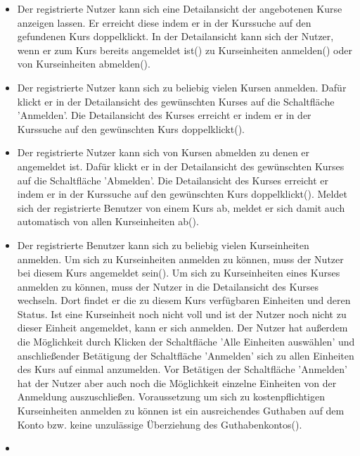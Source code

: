 \documentclass[a4paper]{scrreprt}
\begin{document}
\begin{itemize}
	\item {}
	Der registrierte Nutzer kann sich eine Detailansicht der angebotenen Kurse anzeigen lassen. Er erreicht diese indem er in der Kurssuche auf den gefundenen Kurs doppelklickt. In der Detailansicht kann sich der Nutzer, wenn er zum Kurs bereits angemeldet ist() zu Kurseinheiten anmelden() oder von Kurseinheiten abmelden().
	\item {} 
	Der registrierte Nutzer kann sich zu beliebig vielen Kursen anmelden. 
	Dafür klickt er in der Detailansicht des gewünschten Kurses auf die Schaltfläche 'Anmelden'. Die Detailansicht des Kurses erreicht er indem er in der Kurssuche auf den gewünschten Kurs doppelklickt().
	\item {} 
	Der registrierte Nutzer kann sich von Kursen abmelden zu denen er angemeldet ist. Dafür klickt er in der Detailansicht des gewünschten Kurses auf die Schaltfläche 'Abmelden'. Die Detailansicht des Kurses erreicht er indem er in der Kurssuche auf den gewünschten Kurs doppelklickt(). Meldet sich der registrierte Benutzer von einem Kurs ab, meldet er sich damit auch automatisch von allen Kurseinheiten ab().
	\item {}
	Der registrierte Benutzer kann sich zu beliebig vielen Kurseinheiten anmelden. Um sich zu Kurseinheiten anmelden zu können, muss der Nutzer bei diesem Kurs angemeldet sein().
	Um sich zu Kurseinheiten eines Kurses anmelden zu können, muss der Nutzer in die Detailansicht des Kurses wechseln. Dort findet er die zu diesem Kurs verfügbaren Einheiten und deren Status. Ist eine Kurseinheit noch nicht voll und ist der Nutzer noch nicht zu dieser Einheit angemeldet, kann er sich anmelden. Der Nutzer hat außerdem die Möglichkeit durch Klicken der Schaltfläche 'Alle Einheiten auswählen' und anschließender Betätigung der Schaltfläche 'Anmelden' sich zu allen Einheiten des Kurs auf einmal anzumelden. Vor Betätigen der Schaltfläche 'Anmelden' hat der Nutzer aber auch noch die Möglichkeit einzelne Einheiten von der Anmeldung auszuschließen. Voraussetzung um sich zu kostenpflichtigen Kurseinheiten anmelden zu können ist ein ausreichendes Guthaben auf dem Konto bzw. keine unzulässige Überziehung des Guthabenkontos().
	\item {}

\end{itemize}
\end{document}
